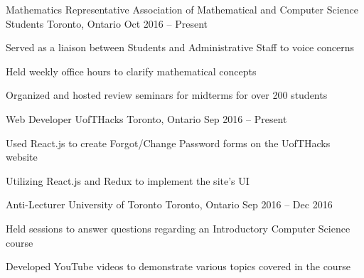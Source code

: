 \begin{cventries}
  \cventry
    {Mathematics Representative}
    {Association of Mathematical and Computer Science Students}
    {Toronto, Ontario}
    {Oct 2016 -- Present}
    {
      \begin{cvitems}
        \item {Served as a liaison between Students and Administrative Staff to voice concerns}
        \item {Held weekly office hours to clarify mathematical concepts}
        \item {Organized and hosted review seminars for midterms for over 200 students}
      \end{cvitems}
    }
    \cventry
    {Web Developer}
    {UofTHacks}
    {Toronto, Ontario}
    {Sep 2016 -- Present}
    {
      \begin{cvitems}
        \item {Used React.js to create Forgot/Change Password forms on the UofTHacks website}
        \item {Utilizing React.js and Redux to implement the site's UI}
      \end{cvitems}
    }
\cventry
    {Anti-Lecturer}
    {University of Toronto}
    {Toronto, Ontario}
    {Sep 2016 -- Dec 2016}
    {
      \begin{cvitems}
        \item {Held sessions to answer questions regarding an Introductory Computer Science course}
        \item {Developed YouTube videos to demonstrate various topics covered in the course}
      \end{cvitems}
    }
\end{cventries}
